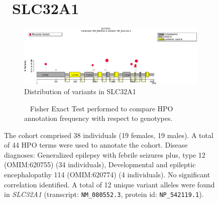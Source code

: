 \begin{figure}[htbp]
\section*{ SLC32A1}
\centering
\begin{subfigure}[b]{0.95\textwidth}
\centering
\includegraphics[width=\textwidth]{ img/SLC32A1_protein_diagram.pdf} 
\captionsetup{justification=raggedright,singlelinecheck=false}
\caption{Distribution of variants in SLC32A1}
\end{subfigure}

\vspace{2em}

\begin{subfigure}[b]{0.95\textwidth}
\centering
{}
\captionsetup{justification=raggedright,singlelinecheck=false}
\caption{             Fisher Exact Test performed to compare HPO annotation frequency with respect to genotypes. }
\end{subfigure}

\vspace{2em}

\caption{ The cohort comprised 38 individuals (19 females, 19 males). A total of 44 HPO terms were used to annotate the cohort. Disease diagnoses: Generalized epilepsy with febrile seizures plus, type 12 (OMIM:620755) (34 individuals), Developmental and epileptic encephalopathy 114 (OMIM:620774) (4 individuals). No significant correlation identified. A total of 12 unique variant alleles were found in \textit{SLC32A1} (transcript: \texttt{NM\_080552.3}, protein id: \texttt{NP\_542119.1}).}
\end{figure}
